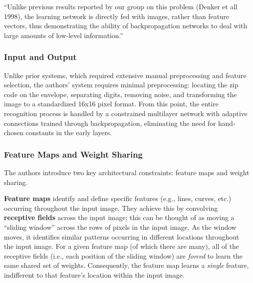 \documentclass[10pt]{article}
\begin{document}
``Unlike previous results reported by our group on this problem (Denker et all 1998), the learning network is directly fed with images, rather than feature vectors, thus demonstrating the ability of backpropagation networks to deal with large amounts of low-level information.''

\subsubsection*{Input and Output}
Unlike prior systems, which required extensive manual preprocessing and feature selection, the authors' system requires minimal preprocessing: locating the zip code on the envelope, separating digits, removing noise, and transforming the image to a standardized 16x16 pixel format. From this point, the entire recognition process is handled by a constrained multilayer network with adaptive connections trained through backpropagation, eliminating the need for hand-chosen constants in the early layers.



\subsubsection*{Feature Maps and Weight Sharing}
The authors introduce two key architectural constraints: feature maps and weight sharing.

\textbf{Feature maps} identify and define specific features (e.g., lines, curves, etc.) occurring throughout the input image. They achieve this by convolving \textbf{receptive fields} across the input image; this can be thought of as moving a ``sliding window'' across the rows of pixels in the input image. As the window moves, it identifies similar patterns occurring in different locations throughout the input image. For a given feature map (of which there are many), all of the receptive fields (i.e., each position of the sliding window) are \textit{forced} to learn the same shared set of weights. Consequently, the feature map learns a \textit{single} feature, indifferent to that feature's location within the input image.
\end{document}
